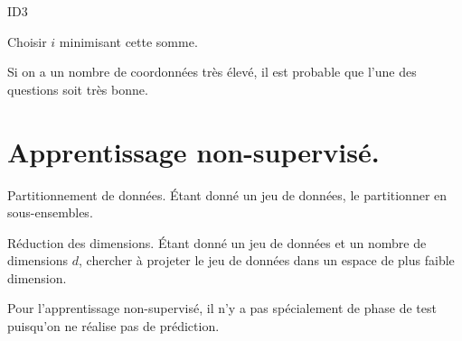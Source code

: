 \documentclass[french, 11pt]{article}
\begin{document}
\begin{ex}{ID3}{}
    \begin{algorithm}[H]
        Choisir $i$ minimisant cette somme.\\
    \end{algorithm}
    Si on a un nombre de coordonnées très élevé, il est probable que l'une des questions soit très bonne.
\end{ex}

\section*{Apprentissage non-supervisé.}

\begin{ex}{Partitionnement de données.}{}
    Étant donné un jeu de données, le partitionner en sous-ensembles.
\end{ex}

\begin{ex}{Réduction des dimensions.}{}
    Étant donné un jeu de données et un nombre de dimensions $d$, chercher à projeter le jeu de données dans un espace de plus faible dimension.
\end{ex}

\begin{defi}{}{}
    Pour l'apprentissage non-supervisé, il n'y a pas spécialement de phase de test puisqu'on ne réalise pas de prédiction.
\end{defi}
\end{document}
